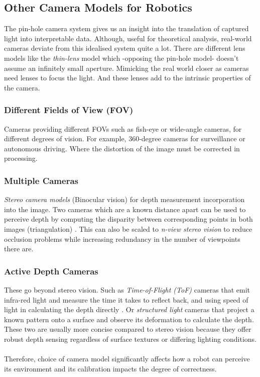\subsection{Other Camera Models for Robotics}
The pin-hole camera system gives us an insight into the translation of captured light into interpretable data. Although, useful for theoretical analysis, real-world cameras deviate from this idealised system quite a lot.
There are different lens models like the \emph{thin-lens} model which -opposing the pin-hole model- doesn't assume an infinitely small aperture. Mimicking the real world closer as cameras need lenses to focus the light. And these lenses add to the intrinsic properties of the camera.

\subsubsection{Different Fields of View (FOV)}
Cameras providing different FOVs such as fish-eye or wide-angle cameras, for different degrees of vision. For example, 360-degree cameras for surveillance or autonomous driving. Where the distortion of the image must be corrected in processing.

\subsubsection{Multiple Cameras}
\emph{Stereo camera models} (Binocular vision) for depth measurement incorporation into the image. Two cameras which are a known distance apart can be used to perceive depth by computing the disparity between corresponding points in both images (triangulation) \cite{hamzah2016literature}. This can also be scaled to \emph{n-view stereo vision} to reduce occlusion problems while increasing redundancy in the number of viewpoints there are.\label{sec:nview}

\subsubsection{Active Depth Cameras}
These go beyond stereo vision. Such as \emph{Time-of-Flight (ToF)} cameras that emit infra-red light and measure the time it takes to reflect back, and using speed of light in calculating the depth directly \cite{foix2011tof,zanuttigh2016time}. Or \emph{structured light} cameras that project a known pattern onto a surface and observe its deformation to calculate the depth. These two are usually more concise compared to stereo vision because they offer robust depth sensing regardless of surface textures or differing lighting conditions.
\\\\
Therefore, choice of camera model significantly affects how a robot can perceive its environment and its calibration impacts the degree of correctness.

